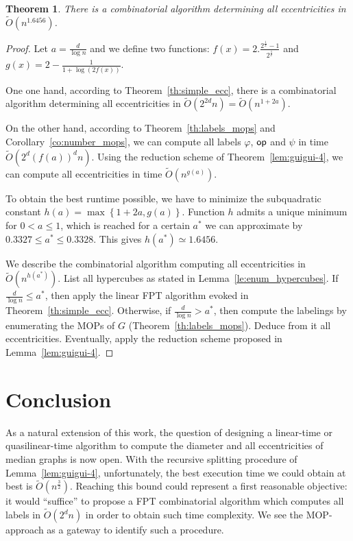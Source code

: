\documentclass{article}
\newtheorem{theorem}{Theorem}
\newcommand{\set}[1]{\left\{ #1 \right\}}
\newcommand{\opp}{\mbox{\textsf{op}}}
\begin{document}
\begin{theorem}
There is a combinatorial algorithm determining all eccentricities in $\tilde{O}(n^{1.6456})$.
\label{th:subquadramop}
\end{theorem}
\begin{proof}
Let $a = \frac{d}{\log n}$ and we define two functions: $f(x) = 2.\frac{2^{\frac{1}{x}}-1}{2^{\frac{1}{x}}}$ and $g(x) = 2-\frac{1}{1+\log (2f(x))}$.

One one hand, according to Theorem~\ref{th:simple_ecc}, there is a combinatorial algorithm determining all eccentricities in $\tilde{O}(2^{2d}n) = \tilde{O}(n^{1+2a})$. 

On the other hand, according to Theorem~\ref{th:labels_mops} and Corollary~\ref{co:number_mops}, we can compute all labels $\varphi$, $\opp$ and $\psi$ in time $\tilde{O}(2^d(f(a))^dn)$. Using the reduction scheme of Theorem~\ref{lem:guigui-4}, we can compute all eccentricities in time $\tilde{O}(n^{g(a)})$.

To obtain the best runtime possible, we have to minimize the subquadratic constant $h(a) =\max \set{1+2a,g(a)}$. Function $h$ admits a unique minimum for $0 < a \le 1$, which is reached for a certain $a^*$ we can approximate by $0.3327 \le a^* \le 0.3328$. This gives $h(a^*) \simeq 1.6456$.

We describe the combinatorial algorithm computing all eccentricities in $\tilde{O}(n^{h(a^*)})$. List all hypercubes as stated in Lemma~\ref{le:enum_hypercubes}. If $\frac{d}{\log n} \le a^*$, then apply the linear FPT algorithm evoked in Theorem~\ref{th:simple_ecc}. Otherwise, if $\frac{d}{\log n} > a^*$, then compute the labelings by enumerating the MOPs of $G$ (Theorem~\ref{th:labels_mops}). Deduce from it all eccentricities. Eventually, apply the reduction scheme proposed in Lemma~\ref{lem:guigui-4}.
\end{proof}

\section{Conclusion} \label{sec:conclusion}

As a natural extension of this work, the question of designing a linear-time or quasilinear-time algorithm to compute
the diameter and all eccentricities of median graphs is now open. With the recursive splitting procedure of Lemma~\ref{lem:guigui-4}, unfortunately, the best execution time we could obtain at best is $\tilde{O}(n^{\frac{3}{2}})$. Reaching this bound could represent a first reasonable objective: it would ``suffice'' to propose a FPT combinatorial algorithm which computes all labels in $\tilde{O}(2^dn)$ in order to obtain such time complexity. We see the MOP-approach as a gateway to identify such a procedure.
\end{document}
